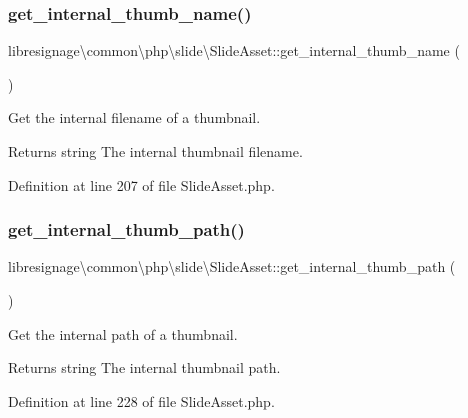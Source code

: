 \subsubsection{\texorpdfstring{get\+\_\+internal\+\_\+thumb\+\_\+name()}{get\_internal\_thumb\_name()}}
{\footnotesize\ttfamily libresignage\textbackslash{}common\textbackslash{}php\textbackslash{}slide\textbackslash{}\+Slide\+Asset\+::get\+\_\+internal\+\_\+thumb\+\_\+name (\begin{DoxyParamCaption}{ }\end{DoxyParamCaption})}

Get the internal filename of a thumbnail.

\begin{DoxyReturn}{Returns}
string The internal thumbnail filename. 
\end{DoxyReturn}


Definition at line 207 of file Slide\+Asset.\+php.

\mbox{\label{classlibresignage_1_1common_1_1php_1_1slide_1_1SlideAsset_a65eaa77a985e56f88745043c2e83b721}} 
\subsubsection{\texorpdfstring{get\+\_\+internal\+\_\+thumb\+\_\+path()}{get\_internal\_thumb\_path()}}
{\footnotesize\ttfamily libresignage\textbackslash{}common\textbackslash{}php\textbackslash{}slide\textbackslash{}\+Slide\+Asset\+::get\+\_\+internal\+\_\+thumb\+\_\+path (\begin{DoxyParamCaption}{ }\end{DoxyParamCaption})}

Get the internal path of a thumbnail.

\begin{DoxyReturn}{Returns}
string The internal thumbnail path. 
\end{DoxyReturn}


Definition at line 228 of file Slide\+Asset.\+php.

\mbox{\label{classlibresignage_1_1common_1_1php_1_1slide_1_1SlideAsset_a942c6f88a026753a3047347328eb9e72}} 
